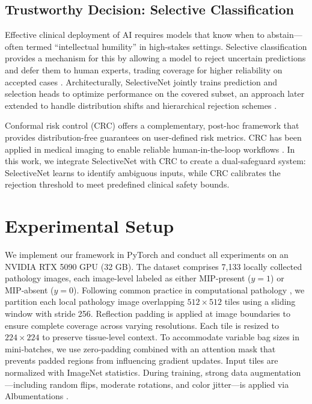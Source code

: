 \documentclass[sigconf,review,anonymous]{acmart}
\theoremstyle{remark}
\begin{document}
\subsection{Trustworthy Decision: Selective Classification}

Effective clinical deployment of AI requires models that know when to abstain—often termed “intellectual humility” in high-stakes settings. Selective classification provides a mechanism for this by allowing a model to reject uncertain predictions and defer them to human experts, trading coverage for higher reliability on accepted cases \cite{hendrycks2016baseline, leibig2022combining}. Architecturally, SelectiveNet \cite{geifman2019selectivenet, geifman2017selective} jointly trains prediction and selection heads to optimize performance on the covered subset, an approach later extended to handle distribution shifts and hierarchical rejection schemes \cite{goren2024hierarchical}.

Conformal risk control (CRC) \cite{angelopoulos2022conformal} offers a complementary, post-hoc framework that provides distribution-free guarantees on user-defined risk metrics. CRC has been applied in medical imaging to enable reliable human-in-the-loop workflows \cite{dvijotham2023enhancing, dai2017tumor}. In this work, we integrate SelectiveNet with CRC to create a dual-safeguard system: SelectiveNet learns to identify ambiguous inputs, while CRC calibrates the rejection threshold to meet predefined clinical safety bounds.

\section{Experimental Setup}\label{S7}

We implement our framework in PyTorch and conduct all experiments on an NVIDIA RTX 5090 GPU (32 GB). The dataset comprises 7,133 locally collected pathology images, each image-level labeled as either MIP‑present ($y = 1$) or MIP‑absent ($y = 0$). Following common practice in computational pathology \cite{campanella2019clinical,lu2021data}, we partition each local pathology image overlapping $512\times512$ tiles using a sliding window with stride 256. Reflection padding is applied at image boundaries to ensure complete coverage across varying resolutions. Each tile is resized to $224\times224$ to preserve tissue-level context. To accommodate variable bag sizes in mini‑batches, we use zero‑padding combined with an attention mask that prevents padded regions from influencing gradient updates. Input tiles are normalized with ImageNet statistics. During training, strong data augmentation---including random flips, moderate rotations, and color jitter---is applied via Albumentations \cite{buslaev2020albumentations}.
\end{document}
